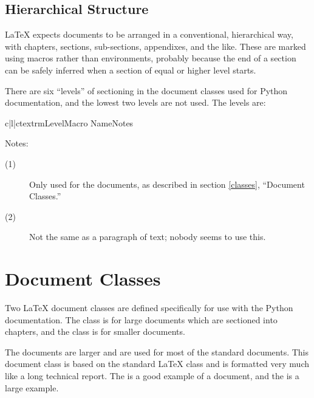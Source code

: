 \documentclass{howto}
\begin{document}
  \subsection{Hierarchical Structure}

    \LaTeX{} expects documents to be arranged in a conventional,
    hierarchical way, with chapters, sections, sub-sections,
    appendixes, and the like.  These are marked using macros rather
    than environments, probably because the end of a section can be
    safely inferred when a section of equal or higher level starts.

    There are six ``levels'' of sectioning in the document classes
    used for Python documentation, and the lowest two levels are not
    used.  The levels are:

      \begin{tableiii}{c|l|c}{textrm}{Level}{Macro Name}{Notes}
      \end{tableiii}

    \noindent
    Notes:

    \begin{description}
      \item[(1)]
      Only used for the  documents, as described in
      section \ref{classes}, ``Document Classes.''
      \item[(2)]
      Not the same as a paragraph of text; nobody seems to use this.
    \end{description}


\section{Document Classes \label{classes}}

  Two \LaTeX{} document classes are defined specifically for use with
  the Python documentation.  The  class is for large
  documents which are sectioned into chapters, and the 
  class is for smaller documents.

  The  documents are larger and are used for most of the
  standard documents.  This document class is based on the standard
  \LaTeX{}  class and is formatted very much like a long
  technical report.  The  is a good example of a  document, and the
   is a large
  example.
\end{document}
